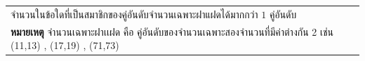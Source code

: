 ﻿%
\question \begin{tabular}[t]{@{}l@{}}
จำนวนในข้อใดที่เป็นสมาชิกของคู่อันดับจำนวนเฉพาะฝาแฝดได้มากกว่า $1$ คู่อันดับ
\\
\textbf{หมายเหตุ} จำนวนเฉพาะฝาเเฝด คือ คู่อันดับของจำนวนเฉพาะสองจำนวนที่มีค่าต่างกัน 2 เช่น (11,13) , (17,19) , (71,73) 
\end{tabular}
\newline
{}
